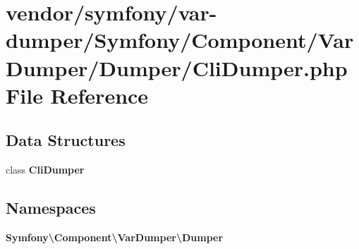 \section{vendor/symfony/var-\/dumper/\+Symfony/\+Component/\+Var\+Dumper/\+Dumper/\+Cli\+Dumper.php File Reference}
\label{_cli_dumper_8php}
\subsection*{Data Structures}
\begin{DoxyCompactItemize}
\item 
class {\bf Cli\+Dumper}
\end{DoxyCompactItemize}
\subsection*{Namespaces}
\begin{DoxyCompactItemize}
\item 
 {\bf Symfony\textbackslash{}\+Component\textbackslash{}\+Var\+Dumper\textbackslash{}\+Dumper}
\end{DoxyCompactItemize}
